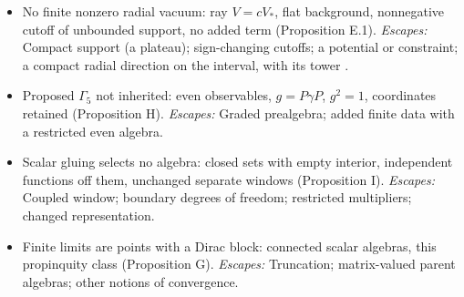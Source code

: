 \documentclass[aps,prd,reprint,onecolumn,nofootinbib,amsmath,amssymb,floatfix]{revtex4-2}
\theoremstyle{plain}
\begin{document}
\begin{itemize}
\item No finite nonzero radial vacuum: ray $V=cV_*$, flat background, nonnegative cutoff of unbounded support, no added term (Proposition E.1). \emph{Escapes:} Compact support (a plateau); sign-changing cutoffs; a potential or constraint; a compact radial direction on the interval, with its tower \cite{boundarynote}.
\item Proposed $\Gamma_5$ not inherited: even observables, $g=P\gamma P$, $g^2=1$, coordinates retained (Proposition H). \emph{Escapes:} Graded prealgebra; added finite data with a restricted even algebra.
\item Scalar gluing selects no algebra: closed sets with empty interior, independent functions off them, unchanged separate windows (Proposition I). \emph{Escapes:} Coupled window; boundary degrees of freedom; restricted multipliers; changed representation.
\item Finite limits are points with a Dirac block: connected scalar algebras, this propinquity class (Proposition G). \emph{Escapes:} Truncation; matrix-valued parent algebras; other notions of convergence.
\end{itemize}
\end{document}
